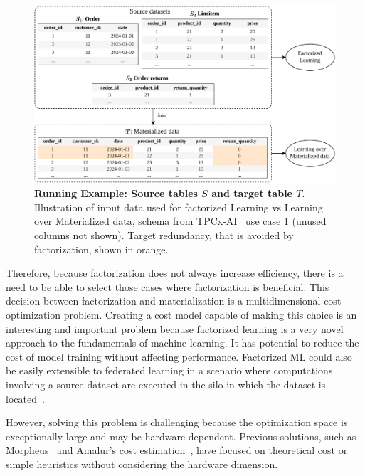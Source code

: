 \begin{figure}[ht]
  \centering
  \includegraphics[width=0.95\linewidth]{chapters/01_introduction/figures/running-example-intro.pdf}
  \caption[Running Example: Source tables $S$ and target table $T$]{\textbf{Running Example: Source tables $S$ and target table $T$}. \\ Illustration of input data used for factorized Learning vs Learning over Materialized data, schema from TPCx-AI~\cite{tpcx-ai} use case 1 (unused columns not shown). Target redundancy, that is avoided by factorization, shown in orange.}
  \label{fig:running-example-fac-vs-mat}
\end{figure}

Therefore, because factorization does not always increase efficiency, there is a need to be able to select those cases where factorization is beneficial. This decision between factorization and materialization is a multidimensional cost optimization problem. Creating a cost model capable of making this choice is an interesting and important problem because factorized learning is a very novel approach to the fundamentals of machine learning. It has potential to reduce the cost of model training without affecting performance. Factorized ML could also be easily extensible to federated learning in a scenario where computations involving a source dataset are executed in the silo in which the dataset is located~\cite{amalur}.

However, solving this problem is challenging because the optimization space is exceptionally large and may be hardware-dependent. Previous solutions, such as Morpheus~\cite{morpheus} and Amalur's cost estimation~\cite{amalur_tkde24}, have focused on theoretical cost or simple heuristics without considering the hardware dimension.

